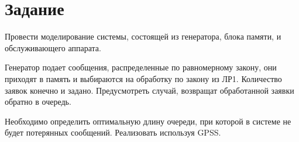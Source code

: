 \chapter{Задание}

Провести моделирование системы, состоящей из генератора, блока памяти, и обслуживающего аппарата. 

Генератор подает сообщения, распределенные по равномерному закону, они приходят в память и выбираются на обработку по закону из ЛР1. Количество заявок конечно и задано. Предусмотреть случай, возвращат обработанной заявки обратно в очередь. 

Необходимо определить оптимальную длину очереди, при которой в системе не будет потерянных сообщений. Реализовать используя GPSS.